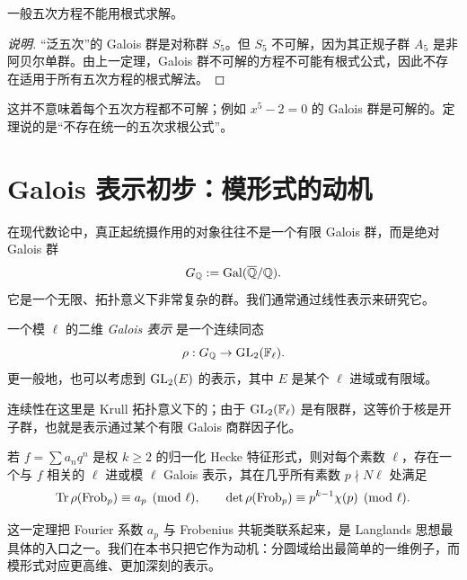 \begin{theorem}
一般五次方程不能用根式求解。
\end{theorem}

\begin{proof}[说明]
“泛五次”的 Galois 群是对称群 $S_5$。但 $S_5$ 不可解，因为其正规子群 $A_5$ 是非阿贝尔单群。由上一定理，Galois 群不可解的方程不可能有根式公式，因此不存在适用于所有五次方程的根式解法。
\end{proof}

\begin{remark}
这并不意味着每个五次方程都不可解；例如 $x^5-2=0$ 的 Galois 群是可解的。定理说的是“不存在统一的五次求根公式”。
\end{remark}

\section{Galois 表示初步：模形式的动机}

在现代数论中，真正起统摄作用的对象往往不是一个有限 Galois 群，而是绝对 Galois 群
\[
 G_{\mathbb{Q}}:=\mathrm{Gal}(\overline{\mathbb{Q}}/\mathbb{Q}).
\]
它是一个无限、拓扑意义下非常复杂的群。我们通常通过线性表示来研究它。

\begin{definition}
一个模 $\ell$ 的二维 \emph{Galois 表示} 是一个连续同态
\[
 \rho:G_{\mathbb{Q}}\to \mathrm{GL}_2(\mathbb{F}_\ell).
\]
更一般地，也可以考虑到 $\mathrm{GL}_2(E)$ 的表示，其中 $E$ 是某个 $\ell$ 进域或有限域。
\end{definition}

\begin{remark}
连续性在这里是 Krull 拓扑意义下的；由于 $\mathrm{GL}_2(\mathbb{F}_\ell)$ 是有限群，这等价于核是开子群，也就是表示通过某个有限 Galois 商群因子化。
\end{remark}

\begin{theorem}
若 $f=\sum a_n q^n$ 是权 $k\ge2$ 的归一化 Hecke 特征形式，则对每个素数 $\ell$，存在一个与 $f$ 相关的 $\ell$ 进或模 $\ell$ Galois 表示，其在几乎所有素数 $p\nmid N\ell$ 处满足
\[
 \mathrm{Tr}\,\rho(\mathrm{Frob}_p)\equiv a_p \pmod{\ell},
\qquad \det\rho(\mathrm{Frob}_p)\equiv p^{k-1}\chi(p) \pmod{\ell}.
\]
\end{theorem}

\begin{remark}
这一定理把 Fourier 系数 $a_p$ 与 Frobenius 共轭类联系起来，是 Langlands 思想最具体的入口之一。我们在本书只把它作为动机：分圆域给出最简单的一维例子，而模形式对应更高维、更加深刻的表示。
\end{remark}

